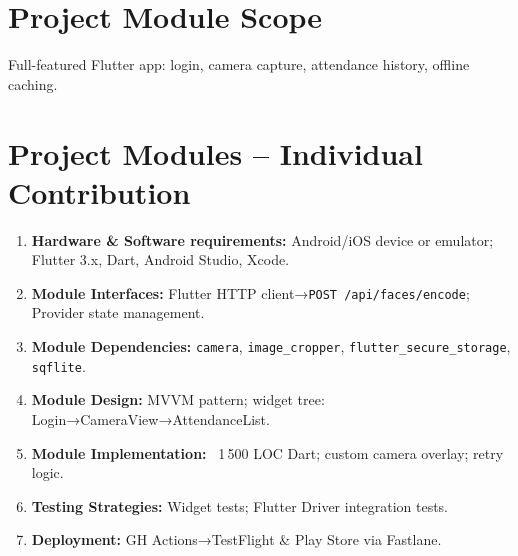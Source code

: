 \documentclass[openany]{report}
\begin{document}
\section{Project Module Scope}
Full-featured Flutter app: login, camera capture, attendance history, offline caching.

\section{Project Modules – Individual Contribution}
\begin{enumerate}
  \item \textbf{Hardware \& Software requirements:} Android/iOS device or emulator; Flutter 3.x, Dart, Android Studio, Xcode.
  \item \textbf{Module Interfaces:} Flutter HTTP client→\texttt{POST /api/faces/encode}; Provider state management.
  \item \textbf{Module Dependencies:} \texttt{camera}, \texttt{image\_cropper}, \texttt{flutter\_secure\_storage}, \texttt{sqflite}.
  \item \textbf{Module Design:} MVVM pattern; widget tree: Login→CameraView→AttendanceList.
  \item \textbf{Module Implementation:} ~1\,500 LOC Dart; custom camera overlay; retry logic.
  \item \textbf{Testing Strategies:} Widget tests; Flutter Driver integration tests.
  \item \textbf{Deployment:} GH Actions→TestFlight \& Play Store via Fastlane.
\end{enumerate}
\end{document}
